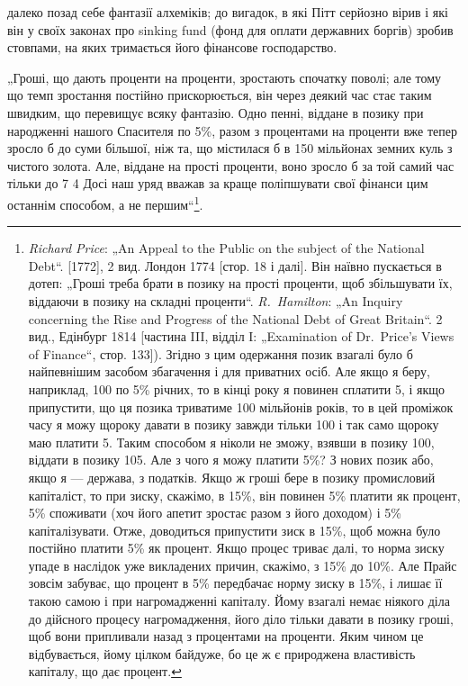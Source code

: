 \parcont{}  %
далеко позад себе фантазії алхеміків; до вигадок, в які Пітт
серйозно вірив і які він у своїх законах про sinking fund (фонд
для оплати державних боргів) зробив стовпами, на яких тримається
його фінансове господарство.

„Гроші, що дають проценти на проценти, зростають спочатку
поволі; але тому що темп зростання постійно прискорюється, він
через деякий час стає таким швидким, що перевищує всяку фантазію.
Одно пенні, віддане в позику при народженні нашого
Спасителя по 5\%, разом з процентами на проценти вже тепер
зросло б до суми більшої, ніж та, що містилася б в 150 мільйонах
земних куль з чистого золота. Але, віддане на прості проценти,
воно зросло б за той самий час тільки до 7 4
Досі наш уряд вважав за краще поліпшувати свої фінанси цим
останнім способом, а не першим“\footnote{
\emph{Richard Price}: „An Appeal to the Public on the subject of the National Debt“.
[1772], 2 вид. Лондон 1774 [стор. 18 і далі]. Він наївно пускається в дотеп: „Гроші
треба брати в позику на прості проценти, щоб збільшувати їх, віддаючи в позику
на складні проценти“. \emph{R.~Hamilton}: „An Inquiry concerning the Rise and
Progress of the National Debt of Great Britain“. 2 вид., Едінбург 1814 [частина III,
відділ I: „Examination of Dr.~Price’s Views of Finance“, стор. 133]). Згідно з цим
одержання позик взагалі було б найпевнішим засобом збагачення і для приватних
осіб. Але якщо я беру, наприклад, 100 по 5\% річних,
то в кінці року я повинен сплатити 5, і якщо припустити, що
ця позика триватиме 100 мільйонів років, то в цей проміжок часу я можу щороку
давати в позику завжди тільки 100 і так само щороку маю платити
5. Таким способом я ніколи не зможу, взявши в позику
100, віддати в позику 105. Але з чого я можу
платити 5\%? З нових позик або, якщо я — держава, з податків. Якщо ж гроші
бере в позику промисловий капіталіст, то при зиску, скажімо, в 15\%, він повинен
5\% платити як процент, 5\% споживати (хоч його апетит зростає разом
з його доходом) і 5\% капіталізувати. Отже, доводиться припустити зиск в 15\%,
щоб можна було постійно платити 5\% як процент. Якщо процес триває далі, то
норма зиску упаде в наслідок уже викладених причин, скажімо, з 15\% до 10\%.
Але Прайс зовсім забуває, що процент в 5\% передбачає норму зиску в 15\%,
і лишає її такою самою і при нагромадженні капіталу. Йому взагалі немає ніякого
діла до дійсного процесу нагромадження, його діло тільки давати в позику
гроші, щоб вони припливали назад з процентами на проценти. Яким чином
це відбувається, йому цілком байдуже, бо це ж є природжена властивість
капіталу, що дає процент.
}.

